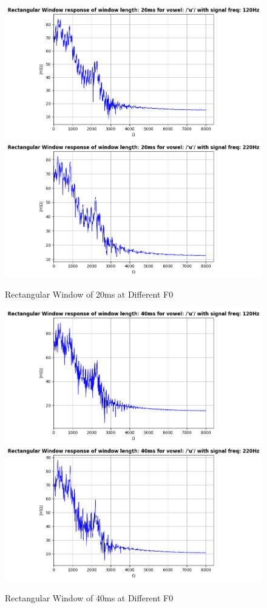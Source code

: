 \documentclass{article}
\begin{document}
\begin{figure}[H]
\centering
\includegraphics[scale = 0.5]{rect_20_120.png}\hfill
\includegraphics[scale = 0.5]{rect_20_220.png}
\caption{Rectangular Window of 20ms at Different F0}
\end{figure}

\begin{figure}[H]
\centering
\includegraphics[scale = 0.5]{rect_40_120.png}\hfill
\includegraphics[scale = 0.5]{rect_40_220.png}
\caption{Rectangular Window of 40ms at Different F0}
\end{figure}
\newpage
\end{document}

